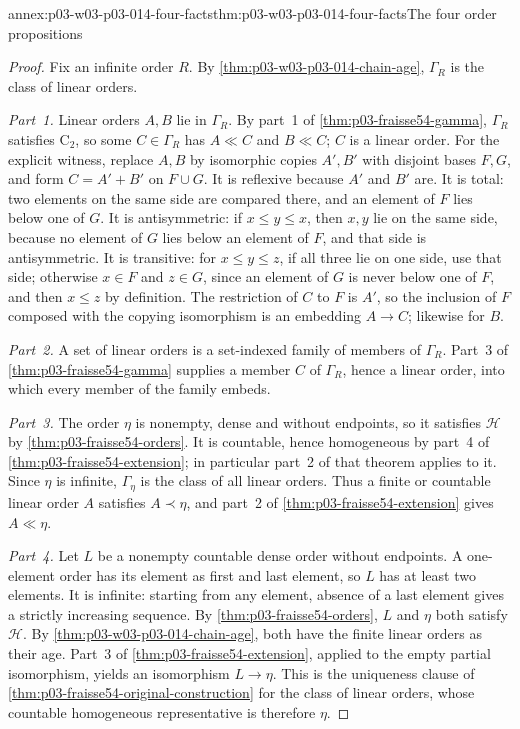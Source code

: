 \begin{annexitem}{annex:p03-w03-p03-014-four-facts}{thm:p03-w03-p03-014-four-facts}{The four order propositions}
\begin{proof}
Fix an infinite order \(R\). By \cref{thm:p03-w03-p03-014-chain-age},
\(\Gamma_R\) is the class of linear orders.

\emph{Part~1.} Linear orders \(A,B\) lie in \(\Gamma_R\). By part~1 of
\cref{thm:p03-fraisse54-gamma}, \(\Gamma_R\) satisfies
\(\mathrm C_2\), so some \(C\in\Gamma_R\) has \(A\ll C\) and
\(B\ll C\); \(C\) is a linear order. For the explicit witness, replace
\(A,B\) by isomorphic copies \(A',B'\) with disjoint bases \(F,G\), and
form \(C=A'+B'\) on \(F\cup G\). It is reflexive because \(A'\) and
\(B'\) are. It is total: two elements on the same side are compared
there, and an element of \(F\) lies below one of \(G\). It is
antisymmetric: if \(x\leq y\leq x\), then \(x,y\) lie on the same side,
because no element of \(G\) lies below an element of \(F\), and that
side is antisymmetric. It is transitive: for \(x\leq y\leq z\), if all
three lie on one side, use that side; otherwise \(x\in F\) and
\(z\in G\), since an element of \(G\) is never below one of \(F\), and
then \(x\leq z\) by definition. The restriction of \(C\) to \(F\) is
\(A'\), so the inclusion of \(F\) composed with the copying isomorphism
is an embedding \(A\to C\); likewise for \(B\).

\emph{Part~2.} A set of linear orders is a set-indexed family of members
of \(\Gamma_R\). Part~3 of \cref{thm:p03-fraisse54-gamma} supplies a
member \(C\) of \(\Gamma_R\), hence a linear order, into which every
member of the family embeds.

\emph{Part~3.} The order \(\eta\) is nonempty, dense and without
endpoints, so it satisfies \(\mathcal H\) by
\cref{thm:p03-fraisse54-orders}. It is countable, hence homogeneous by
part~4 of \cref{thm:p03-fraisse54-extension}; in particular part~2 of
that theorem applies to it. Since \(\eta\) is infinite,
\(\Gamma_\eta\) is the class of all linear orders. Thus a finite or
countable linear order \(A\) satisfies \(A\prec\eta\), and part~2 of
\cref{thm:p03-fraisse54-extension} gives \(A\ll\eta\).

\emph{Part~4.} Let \(L\) be a nonempty countable dense order without
endpoints. A one-element order has its element as first and last element,
so \(L\) has at least two elements. It is infinite: starting from any
element, absence of a last element gives a strictly increasing sequence.
By \cref{thm:p03-fraisse54-orders}, \(L\) and \(\eta\) both satisfy
\(\mathcal H\). By \cref{thm:p03-w03-p03-014-chain-age}, both have the
finite linear orders as their age. Part~3 of
\cref{thm:p03-fraisse54-extension}, applied to the empty partial
isomorphism, yields an isomorphism \(L\to\eta\). This is the uniqueness
clause of \cref{thm:p03-fraisse54-original-construction} for the class
of linear orders, whose countable homogeneous representative is
therefore \(\eta\).


\end{proof}
\end{annexitem}
